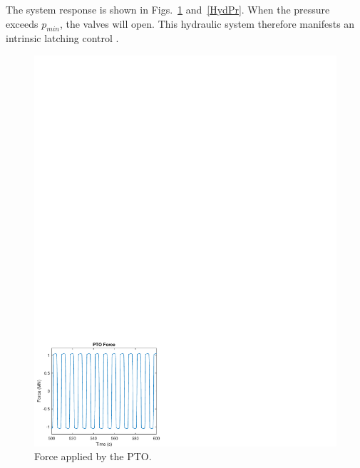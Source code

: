 \documentclass[twocolumn,10pt]{asme2e}
\begin{document}
The system response is shown in Figs.~\ref{HydF} and~\ref{HydPr}. When the pressure exceeds $p_{min}$, the valves will open. This hydraulic system therefore manifests an intrinsic latching control \cite{falnes2005ocean}.

\begin{figure}[t]
    \centering
    \includegraphics[width=1\columnwidth]{Images/ptoForce}
    \caption{Force applied by the PTO.}
    \label{HydF}
    \end{figure}
\end{document}
